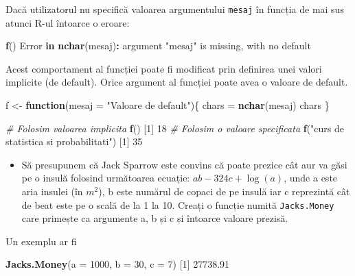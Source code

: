 \documentclass[]{article}
\newenvironment{Shaded}{\begin{snugshade}}{\end{snugshade}}
\newcommand{\CommentTok}[1]{\textcolor[rgb]{0.56,0.35,0.01}{\textit{#1}}}
\newcommand{\ControlFlowTok}[1]{\textcolor[rgb]{0.13,0.29,0.53}{\textbf{#1}}}
\newcommand{\DataTypeTok}[1]{\textcolor[rgb]{0.13,0.29,0.53}{#1}}
\newcommand{\DecValTok}[1]{\textcolor[rgb]{0.00,0.00,0.81}{#1}}
\newcommand{\FloatTok}[1]{\textcolor[rgb]{0.00,0.00,0.81}{#1}}
\newcommand{\KeywordTok}[1]{\textcolor[rgb]{0.13,0.29,0.53}{\textbf{#1}}}
\newcommand{\NormalTok}[1]{#1}
\newcommand{\OperatorTok}[1]{\textcolor[rgb]{0.81,0.36,0.00}{\textbf{#1}}}
\newcommand{\StringTok}[1]{\textcolor[rgb]{0.31,0.60,0.02}{#1}}
\newenvironment{frshaded*}{%
  \def\FrameCommand{\fboxrule=\FrameRule\fboxsep=\FrameSep \fcolorbox{framecolor}{shadecolor1}}%
  \MakeFramed {\advance\hsize-\width \FrameRestore}}%
{\endMakeFramed}
\newenvironment{rmdblock}[1]
  {\begin{frshaded*}
  \begin{itemize}
  \renewcommand{\labelitemi}{
    \raisebox{-.7\height}[0pt][0pt]{
      {\setkeys{Gin}{width=2em,keepaspectratio}\texttt{[image: images/icons/\#1]}}
    }
  }
  \item
  }
  {
  \end{itemize}
  \end{frshaded*}
  }
\newenvironment{rmdexercise}
  {\begin{rmdblock}{exercise}}
  {\end{rmdblock}}
\begin{document}
Dacă utilizatorul nu specifică valoarea argumentului \texttt{mesaj} în
funcția de mai sus atunci R-ul întoarce o eroare:

\begin{Shaded}
\begin{Highlighting}[]
\KeywordTok{f}\NormalTok{()}
\NormalTok{Error }\ControlFlowTok{in} \KeywordTok{nchar}\NormalTok{(mesaj)}\OperatorTok{:}\StringTok{ }\NormalTok{argument }\StringTok{"mesaj"}\NormalTok{ is missing, with no default}
\end{Highlighting}
\end{Shaded}

Acest comportament al funcției poate fi modificat prin definirea unei
valori implicite (de default). Orice argument al funcției poate avea o
valoare de default.

\begin{Shaded}
\begin{Highlighting}[]
\NormalTok{f <-}\StringTok{ }\ControlFlowTok{function}\NormalTok{(}\DataTypeTok{mesaj =} \StringTok{"Valoare de default"}\NormalTok{)\{}
\NormalTok{  chars =}\StringTok{ }\KeywordTok{nchar}\NormalTok{(mesaj)}
\NormalTok{  chars}
\NormalTok{\}}

\CommentTok{# Folosim valoarea implicita }
\KeywordTok{f}\NormalTok{()}
\NormalTok{[}\DecValTok{1}\NormalTok{] }\DecValTok{18}
\CommentTok{# Folosim o valoare specificata}
\KeywordTok{f}\NormalTok{(}\StringTok{"curs de statistica si probabilitati"}\NormalTok{)}
\NormalTok{[}\DecValTok{1}\NormalTok{] }\DecValTok{35}
\end{Highlighting}
\end{Shaded}

\begin{rmdexercise}
Să presupunem că Jack Sparrow este convins că poate prezice cât aur va
găsi pe o insulă folosind următoarea ecuație: \(ab - 324c + \log(a)\),
unde a este aria insulei (în \(m^2\)), b este numărul de copaci de pe
insulă iar c reprezintă cât de beat este pe o scală de la 1 la 10.
Creați o funcție numită \texttt{Jacks.Money} care primește ca argumente
a, b și c și întoarce valoare prezisă.
\end{rmdexercise}

Un exemplu ar fi

\begin{Shaded}
\begin{Highlighting}[]
\KeywordTok{Jacks.Money}\NormalTok{(}\DataTypeTok{a =} \DecValTok{1000}\NormalTok{, }\DataTypeTok{b =} \DecValTok{30}\NormalTok{, }\DataTypeTok{c =} \DecValTok{7}\NormalTok{)}
\NormalTok{[}\DecValTok{1}\NormalTok{] }\FloatTok{27738.91}
\end{Highlighting}
\end{Shaded}
\end{document}
